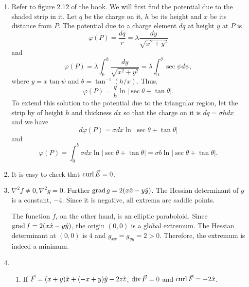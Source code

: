 \documentclass{article}
\begin{document}
\begin{enumerate}
\item Refer to figure 2.12 of the book. We will first find the potential due to
the shaded strip in it. Let $q$ be the charge on it, $h$ be its height and $x$
be its distance from $P$. The potential due to a charge element $dq$ at height
$y$ at $P$ is
\[
\varphi(P) = \frac{dq}{r} = \lambda\frac{dy}{\sqrt{x^2 + y^2}}
\]
and 
\[
\varphi(P) = \lambda\int_0^h\frac{dy}{\sqrt{x^2 + y^2}} = 
\lambda\int_0^\theta\sec\psi d\psi,
\]
where $y = x\tan\psi$ and $\theta = \tan^{-1}(h/x)$. Thus,
\begin{equation}\label{e32}
\varphi(P) = \frac{q}{h}\ln|\sec\theta + \tan\theta|.
\end{equation}
To extend this solution to the potential due to the triangular region, let
the strip by of height $h$ and thickness $dx$ so that the charge on it is
$dq = \sigma hdx$ and we have
\[
d\varphi(P) = \sigma dx\ln|\sec\theta + \tan\theta|
\]
and
\begin{equation}\label{e33}
\varphi(P) = \int_0^b\sigma dx\ln|\sec\theta + \tan\theta| = 
\sigma b\ln|\sec\theta + \tan\theta|.
\end{equation}

\item It is easy to check that $\operatorname{curl}\vec{E} = 0$.

\item $\nabla^2 f \ne 0, \nabla^2 g = 0$. Further $\operatorname{grad} g = 2(x\hat{x} - y\hat{y})$.
The Hessian determinant of $g$ is a constant, $-4$. Since it is negative, all extrema
are saddle points.

The function $f$, on the other hand, is an elliptic paraboloid. Since $\operatorname{grad} f = 
2(x\hat{x} - y\hat{y})$, the origin $(0, 0)$ is a global extremum. The Hessian 
determinant at $(0, 0)$ is $4$ and $g_{xx} = g_{yy} = 2 > 0$. Therefore, the 
extremum is indeed a minimum.

\item 
\begin{enumerate}
\item If $\vec{F} = (x + y)\hat{x} + (-x + y)\hat{y} - 2z\hat{z}$, $\operatorname{div}\vec{F} = 0$
and $\operatorname{curl}\vec{F} = -2\hat{x}$.


\end{enumerate}
\end{enumerate}
\end{document}
